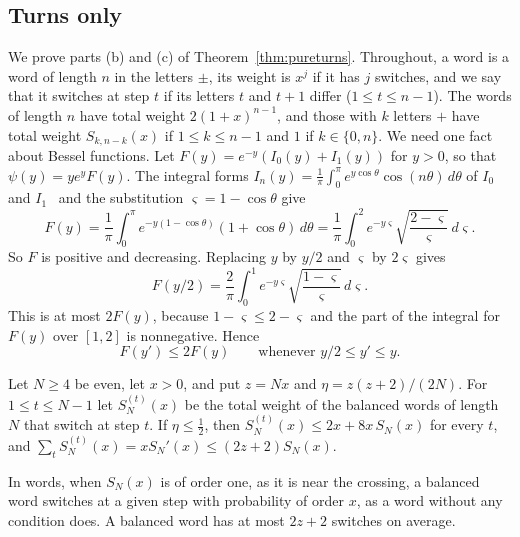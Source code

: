 \subsection{Turns only}

We prove parts (b) and (c) of Theorem~\ref{thm:pureturns}. Throughout, a word is a word of length
$n$ in the letters $\pm$, its weight is $x^j$ if it has $j$ switches, and we say that it switches at
step $t$ if its letters $t$ and $t+1$ differ ($1\le t\le n-1$). The words of length $n$ have total
weight $2(1+x)^{n-1}$, and those with $k$ letters $+$ have total weight $S_{k,n-k}(x)$ if
$1\le k\le n-1$ and $1$ if $k\in\{0,n\}$. We need one fact about Bessel functions. Let
$F(y)=e^{-y}(I_0(y)+I_1(y))$ for $y>0$, so that $\psi(y)=ye^yF(y)$. The integral forms
$I_n(y)=\frac1\pi\int_0^\pi e^{y\cos\theta}\cos(n\theta)\,d\theta$ of $I_0$ and
$I_1$~\cite[Eq.~10.32.3]{dlmf} and the substitution $\varsigma=1-\cos\theta$ give
\[
 F(y)=\frac1\pi\int_0^\pi e^{-y(1-\cos\theta)}(1+\cos\theta)\,d\theta
 =\frac1\pi\int_0^2e^{-y\varsigma}\sqrt{\frac{2-\varsigma}\varsigma}\,d\varsigma .
\]
So $F$ is positive and decreasing. Replacing $y$ by $y/2$ and $\varsigma$ by $2\varsigma$ gives
\[
 F(y/2)=\frac2\pi\int_0^1e^{-y\varsigma}\sqrt{\frac{1-\varsigma}\varsigma}\,d\varsigma .
\]
This is at most $2F(y)$, because $1-\varsigma\le2-\varsigma$ and the part of the integral for
$F(y)$ over $[1,2]$ is nonnegative. Hence
\begin{equation}\label{eq:app-planar-F}
 F(y')\le2F(y)\qquad\text{whenever }y/2\le y'\le y .
\end{equation}

\begin{lemma}\label{lem:oneswitch}
Let $N\ge4$ be even, let $x>0$, and put $z=Nx$ and $\eta=z(z+2)/(2N)$. For $1\le t\le N-1$ let
$S^{(t)}_N(x)$ be the total weight of the balanced words of length $N$ that switch at step $t$. If
$\eta\le\frac12$, then $S^{(t)}_N(x)\le2x+8x\,S_N(x)$ for every $t$, and
$\sum_tS^{(t)}_N(x)=xS_N'(x)\le(2z+2)S_N(x)$.
\end{lemma}

In words, when $S_N(x)$ is of order one, as it is near the crossing, a balanced word switches
at a given step with probability of order $x$, as a word without any condition does. A balanced
word has at most $2z+2$ switches on average.

